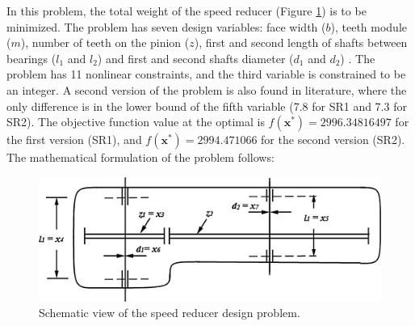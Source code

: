 

In this problem, the total weight of the speed reducer (Figure \ref{fig:SR}) is to be minimized. The problem has seven design variables: face width ($b$), teeth module ($m$), number of teeth on the pinion ($z$), first and second length of shafts between bearings ($l_1$ and $l_2$) and first and second shafts diameter ($d_1$ and $d_2$) \citep{SR}. The problem has 11 nonlinear constraints, and the third variable is constrained to be an integer. A second version of the problem is also found in literature, where the only difference is in the lower bound of the fifth variable (7.8 for SR1 and 7.3 for SR2). The objective function value at the optimal is $f(\bm{x}^*) = 2996.34816497$ for the first version (SR1), and $f(\bm{x}^*) = 2994.471066$ for the second version (SR2). The mathematical formulation of the problem follows:

\vspace{-0.5cm}



\vspace{0.5cm}

\begin{figure}[h]
    \begin{center}
    \includegraphics[scale=0.6]{Imgs/SR.jpg}
    \end{center}
    \captionsetup{justification=centering}
    \caption{Schematic view of the speed reducer design problem.}\label{fig:SR}
\end{figure}
